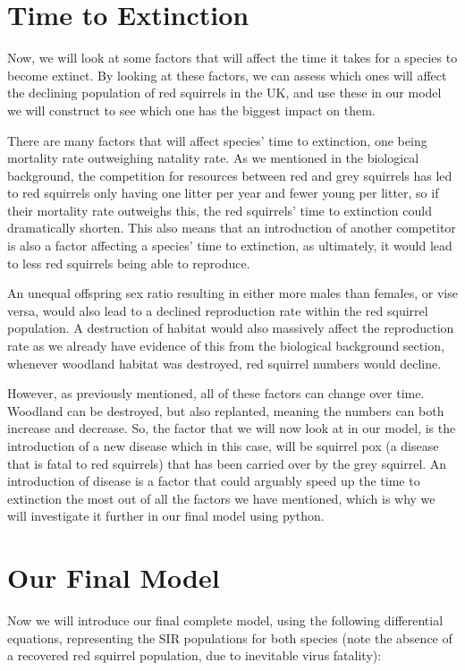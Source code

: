 \documentclass{article}
\begin{document}
\section{Time to Extinction}

Now, we will look at some factors that will affect the time it takes for a species to become extinct. By looking at these factors, we can assess which ones will affect the declining population of red squirrels in the UK, and use these in our model we will construct to see which one has the biggest impact on them.
 
There are many factors that will affect species’ time to extinction, one being mortality rate outweighing natality rate. As we mentioned in the biological background, the competition for resources between red and grey squirrels has led to red squirrels only having one litter per year and fewer young per litter, so if their mortality rate outweighs this, the red squirrels' time to extinction could dramatically shorten. This also means that an introduction of another competitor is also a factor affecting a species’ time to extinction, as ultimately, it would lead to less red squirrels being able to reproduce.

An unequal offspring sex ratio resulting in either more males than females, or vise versa, would also lead to a declined reproduction rate within the red squirrel population. A destruction of habitat would also massively affect the reproduction rate as we already have evidence of this from the biological background section, whenever woodland habitat was destroyed, red squirrel numbers would decline.

However, as previously mentioned, all of these factors can change over time. Woodland can be destroyed, but also replanted, meaning the numbers can both increase and decrease. So, the factor that we will now look at in our model, is the introduction of a new disease which in this case, will be squirrel pox (a disease that is fatal to red squirrels) that has been carried over by the grey squirrel. An introduction of disease is a factor that could arguably speed up the time to extinction the most out of all the factors we have mentioned, which is why we will investigate it further in our final model using python.

\section{Our Final Model}

Now we will introduce our final complete model, using the following differential equations, representing the SIR populations for both species (note the absence of a recovered red squirrel population, due to inevitable virus fatality):
\end{document}
